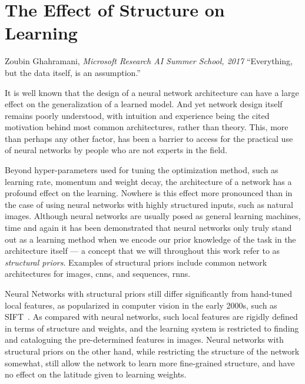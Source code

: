 \documentclass[thesis]{subfiles}
\begin{document}
	\chapter{The Effect of Structure on Learning}\label{motivation}
	\begin{chapquote}{Zoubin Ghahramani, \textit{Microsoft Research AI Summer School, 2017}}
		``Everything, but the data itself, is an assumption.''
	\end{chapquote}
	It is well known that the design of a neural network architecture can have a large effect on the generalization of a learned model. And yet network design itself remains poorly understood, with intuition and experience being the cited motivation behind most common architectures, rather than theory. This, more than perhaps any other factor, has been a barrier to access for the practical use of neural networks by people who are not experts in the field.
	
	Beyond hyper-parameters used for tuning the optimization method, such as learning rate, momentum and weight decay, the architecture of a network has a profound effect on the learning. Nowhere is this effect more pronounced than in the case of using neural networks with highly structured inputs, such as natural images. Although neural networks are usually posed as general learning machines, time and again it has been demonstrated that neural networks only truly stand out as a learning method when we encode our prior knowledge of the task in the architecture itself --- a concept that we will throughout this work refer to as \emph{structural priors}. Examples of structural priors include common network architectures for images, \glspl{cnn}, and sequences, \glspl{rnn}.
	
	Neural Networks with structural priors still differ significantly from hand-tuned local features, as popularized in computer vision in the early 2000s, such as SIFT~\citep{Lowe2004}. As compared with neural networks, such local features are rigidly defined in terms of structure and weights, and the learning system is restricted to finding and cataloguing the pre-determined features in images. Neural networks with structural priors on the other hand, while restricting the structure of the network somewhat, still allow the network to learn more fine-grained structure, and have no effect on the latitude given to learning weights.
	
\end{document}
